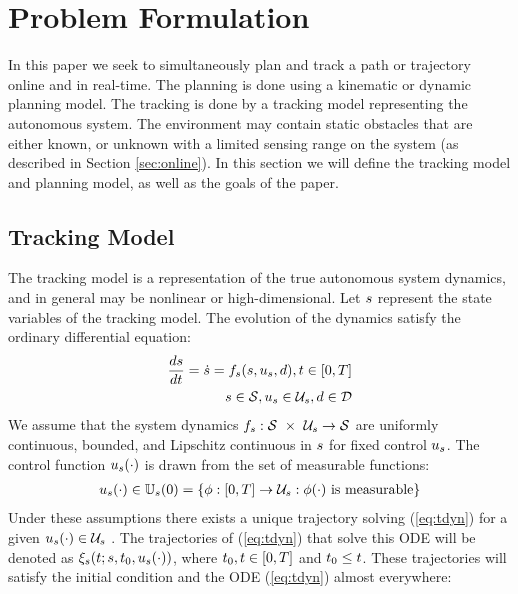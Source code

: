 \section{Problem Formulation \label{sec:formulation}}
In this paper we seek to simultaneously plan and track a path or trajectory online and in real-time. The planning is done using a kinematic or dynamic planning model. The tracking is done by a tracking model representing the autonomous system. The environment may contain static obstacles that are either known, or unknown with a limited sensing range on the system (as described in Section \ref{sec:online}). In this section we will define the tracking model and planning model, as well as the goals of the paper.

\subsection{Tracking Model}
The tracking model is a representation of the true autonomous system dynamics, and in general may be nonlinear or high-dimensional. Let $s$ represent the state variables of the tracking model. The evolution of the dynamics satisfy the ordinary differential equation: 
\begin{equation}
\begin{aligned}
\label{eq:tdyn}
\frac{ds}{dt} = \dot{s} = f_s(s, u_s, d), t \in [0, T] \\
s \in \mathcal{S}, u_s \in \mathcal{U}_s, d \in \mathcal{D}
\end{aligned}
\end{equation}
We assume that the system dynamics $f_s : \mathcal{S}\ \times\ \mathcal{U}_s \rightarrow \mathcal{S}$ are uniformly continuous, bounded, and Lipschitz continuous in $s$ for fixed control $u_s$. The control function $u_s(\cdot)$ is drawn from the set of measurable functions:
\begin{equation}
\begin{aligned}
u_s(\cdot) \in \mathbb{U}_s(0) = \{\phi: [0, T] \rightarrow \mathcal{U}_s: \phi(\cdot) \text{ is measurable}\}
\end{aligned}
\end{equation}
Under these assumptions there exists a unique trajectory solving (\ref{eq:tdyn}) for a given $u_s(\cdot) \in \mathcal{U}_s$ \cite{Coddington84}. The trajectories of (\ref{eq:tdyn}) that solve this ODE will be denoted as $\xi_{s}(t; s, t_0, u_s(\cdot))$, where $t_0,t \in [0, T]$ and $t_0 \leq t$. These trajectories will satisfy the initial condition and the ODE (\ref{eq:tdyn}) almost everywhere:
